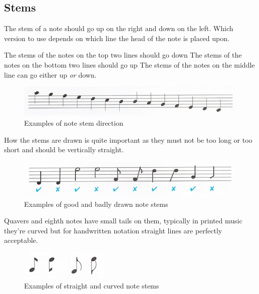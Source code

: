 \subsection*{Stems}

The stem of a note should go up on the right and down on the left. Which version to use depends on which line the head of the note is placed upon.

The stems of the notes on the top two lines should go down
The stems of the notes on the bottom two lines should go up
The stems of the notes on the middle line can go either up \emph{or} down.

\begin{figure}[h!]
  \includegraphics[width=\linewidth]{gfx/basic/stems-chromatic.png}
  \centering
  \caption{Examples of note stem direction}
  \label{fig:StemsChromatic}
\end{figure}

How the stems are drawn is quite important as they must not be too long or too short and should be vertically straight.

\begin{figure}[h!]
  \includegraphics[width=\linewidth]{gfx/basic/stems-good-bad.png}
  \centering
  \caption{Examples of good and badly drawn note stems}
  \label{fig:StemsGoodBad}
\end{figure}

Quavers and eighth notes have small tails on them, typically in printed music they're curved but for handwritten notation straight lines are perfectly acceptable.

\begin{figure}[h!]
  \includegraphics[width=0.4\linewidth]{gfx/basic/stems-curved.png}
  \centering
  \caption{Examples of straight and curved note stems}
  \label{fig:StemsStraightCurved}
\end{figure}

